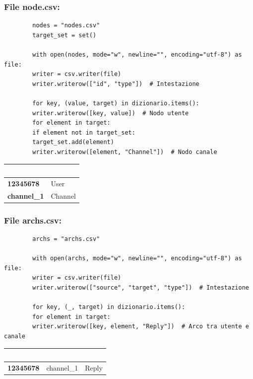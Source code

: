 \documentclass[12pt]{article}
\begin{document}
	\subsubsection{File node.csv:}
	\begin{lstlisting}
		nodes = "nodes.csv"
		target_set = set()
		
		with open(nodes, mode="w", newline="", encoding="utf-8") as file:
		writer = csv.writer(file)
		writer.writerow(["id", "type"])  # Intestazione
		
		for key, (value, target) in dizionario.items():
		writer.writerow([key, value])  # Nodo utente
		for element in target:
		if element not in target_set:
		target_set.add(element)
		writer.writerow([element, "Channel"])  # Nodo canale
	\end{lstlisting}
	\begin{table}[h!]
		\centering
		\renewcommand{\arraystretch}{1.5}
		\setlength{\tabcolsep}{12pt}
		\begin{tabular}{|p{6cm}|p{8cm}|}
			\hline
			\cellcolor{darkblue}\textcolor{white}{\textbf{ID}} & \cellcolor{darkblue}\textcolor{white}{\textbf{Type}} \\
			\hline
			\textbf{12345678} & User \\
			\hline
			\textbf{channel\_1} & Channel\\
			\hline
		\end{tabular}
	\end{table}
	\newpage
	\subsubsection{File archs.csv:}
	\begin{lstlisting}
		archs = "archs.csv"
		
		with open(archs, mode="w", newline="", encoding="utf-8") as file:
		writer = csv.writer(file)
		writer.writerow(["source", "target", "type"])  # Intestazione
		
		for key, (_, target) in dizionario.items():
		for element in target:
		writer.writerow([key, element, "Reply"])  # Arco tra utente e canale
	\end{lstlisting}
	\begin{table}[h!]
		\centering
		\renewcommand{\arraystretch}{1.5}
		\setlength{\tabcolsep}{12pt}
		\begin{tabular}{|p{5cm}|p{4cm}|p{4cm}|}
			\hline
			\cellcolor{darkblue}\textcolor{white}{\textbf{Source}} & 
			\cellcolor{darkblue}\textcolor{white}{\textbf{Target}} & 
			\cellcolor{darkblue}\textcolor{white}{\textbf{Type}} \\
			\hline
			\textbf{12345678} & channel\_1 & Reply \\
			\hline
		\end{tabular}
	\end{table}
\end{document}
